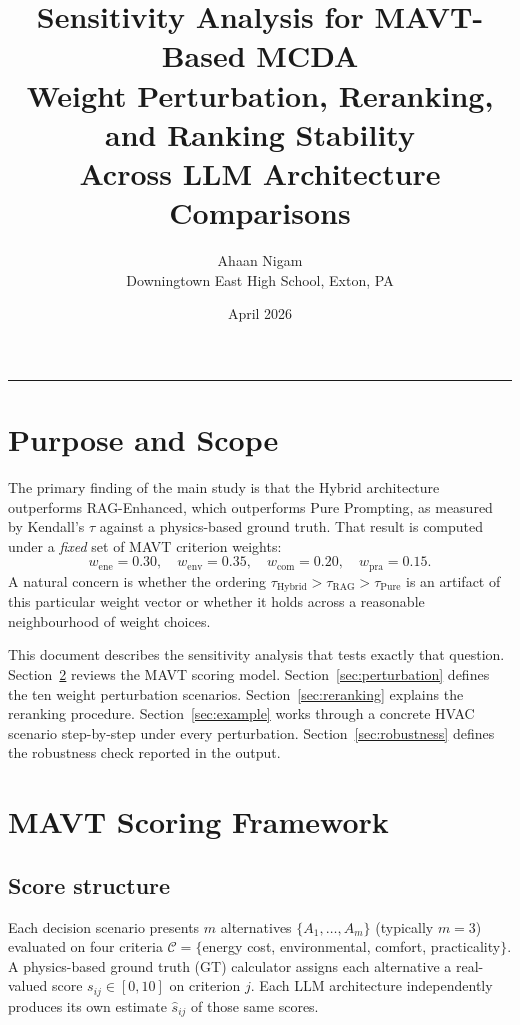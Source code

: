 \documentclass[11pt]{article}
\title{\textbf{Sensitivity Analysis for MAVT-Based MCDA}\\[0.4em]
       \large Weight Perturbation, Reranking, and Ranking Stability\\
       Across LLM Architecture Comparisons}
\author{Ahaan Nigam\\
        Downingtown East High School, Exton, PA}
\date{April 2026}
\begin{document}
\maketitle
\tableofcontents
\vspace{1em}
\hrule
\vspace{1em}

\section{Purpose and Scope}
\label{sec:purpose}

The primary finding of the main study is that the Hybrid architecture outperforms
RAG-Enhanced, which outperforms Pure Prompting, as measured by Kendall's $\tau$
against a physics-based ground truth.  That result is computed under a \emph{fixed}
set of MAVT criterion weights:
\[
  w_{\text{ene}} = 0.30, \quad
  w_{\text{env}} = 0.35, \quad
  w_{\text{com}} = 0.20, \quad
  w_{\text{pra}} = 0.15.
\]
A natural concern is whether the ordering
$\tau_{\text{Hybrid}} > \tau_{\text{RAG}} > \tau_{\text{Pure}}$
is an artifact of this particular weight vector or whether it holds
across a reasonable neighbourhood of weight choices.

This document describes the sensitivity analysis that tests exactly that question.
Section~\ref{sec:mavt} reviews the MAVT scoring model.
Section~\ref{sec:perturbation} defines the ten weight perturbation scenarios.
Section~\ref{sec:reranking} explains the reranking procedure.
Section~\ref{sec:example} works through a concrete HVAC scenario
step-by-step under every perturbation.
Section~\ref{sec:robustness} defines the robustness check reported in the output.

\section{MAVT Scoring Framework}
\label{sec:mavt}

\subsection{Score structure}

Each decision scenario presents $m$ alternatives $\{A_1, \ldots, A_m\}$
(typically $m = 3$) evaluated on four criteria
$\mathcal{C} = \{$energy cost, environmental, comfort, practicality$\}$.
A physics-based ground truth (GT) calculator assigns each
alternative a real-valued score $s_{ij} \in [0,10]$ on criterion $j$.
Each LLM architecture independently produces its own estimate $\hat{s}_{ij}$
of those same scores.
\end{document}
